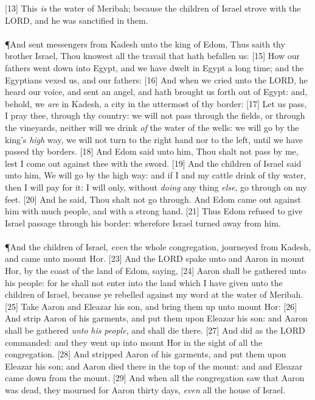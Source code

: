 [13] \textcolor[cmyk]{0.99998,1,0,0}{This \emph{is} the water of Meribah; because the children of Israel strove with the LORD, and he was sanctified in them.}\\
\\
\P  \textcolor[cmyk]{0.99998,1,0,0}{And  sent messengers from Kadesh unto the king of Edom, Thus saith thy brother Israel, Thou knowest all the travail that hath befallen us:}
[15] \textcolor[cmyk]{0.99998,1,0,0}{How our fathers went down into Egypt, and we have dwelt in Egypt a long time; and the Egyptians vexed us, and our fathers:}
[16] \textcolor[cmyk]{0.99998,1,0,0}{And when we cried unto the LORD, he heard our voice, and sent an angel, and hath brought us forth out of Egypt: and, behold, we \emph{are} in Kadesh, a city in the uttermost of thy border:}
[17] \textcolor[cmyk]{0.99998,1,0,0}{Let us pass, I pray thee, through thy country: we will not pass through the fields, or through the vineyards, neither will we drink \emph{of} the water of the wells: we will go by the king's \emph{high} way, we will not turn to the right hand nor to the left, until we have passed thy borders.}
[18] \textcolor[cmyk]{0.99998,1,0,0}{And Edom said unto him, Thou shalt not pass by me, lest I come out against thee with the sword.}
[19] \textcolor[cmyk]{0.99998,1,0,0}{And the children of Israel said unto him, We will go by the high way: and if I and my cattle drink of thy water, then I will pay for it: I will only, without \emph{doing} any thing \emph{else}, go through on my feet.}
[20] \textcolor[cmyk]{0.99998,1,0,0}{And he said, Thou shalt not go through. And Edom came out against him with much people, and with a strong hand.}
[21] \textcolor[cmyk]{0.99998,1,0,0}{Thus Edom refused to give Israel passage through his border: wherefore Israel turned away from him.}\\
\\
\P \textcolor[cmyk]{0.99998,1,0,0}{And the children of Israel, \emph{even} the whole congregation, journeyed from Kadesh, and came unto mount Hor.}
[23] \textcolor[cmyk]{0.99998,1,0,0}{And the LORD spake unto  and Aaron in mount Hor, by the coast of the land of Edom, saying,}
[24] \textcolor[cmyk]{0.99998,1,0,0}{Aaron shall be gathered unto his people: for he shall not enter into the land which I have given unto the children of Israel, because ye rebelled against my word at the water of Meribah.}
[25] \textcolor[cmyk]{0.99998,1,0,0}{Take Aaron and Eleazar his son, and bring them up unto mount Hor:}
[26] \textcolor[cmyk]{0.99998,1,0,0}{And strip Aaron of his garments, and put them upon Eleazar his son: and Aaron shall be gathered \emph{unto} \emph{his} \emph{people}, and shall die there.}
[27] \textcolor[cmyk]{0.99998,1,0,0}{And  did as the LORD commanded: and they went up into mount Hor in the sight of all the congregation.}
[28] \textcolor[cmyk]{0.99998,1,0,0}{And  stripped Aaron of his garments, and put them upon Eleazar his son; and Aaron died there in the top of the mount: and  and Eleazar came down from the mount.}
[29] \textcolor[cmyk]{0.99998,1,0,0}{And when all the congregation saw that Aaron was dead, they mourned for Aaron thirty days, \emph{even} all the house of Israel.}